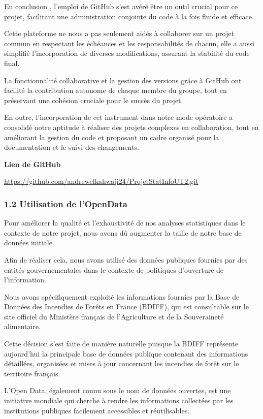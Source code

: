 \documentclass[
]{article}
\begin{document}
En conclusion , l'emploi de GitHub s'est avéré être un outil crucial
pour ce projet, facilitant une administration conjointe du code à la
fois fluide et efficace.

Cette plateforme ne nous a pas seulement aidés à collaborer sur un
projet commun en respectant les échéances et les responsabilités de
chacun, elle a aussi simplifié l'incorporation de diverses
modifications, assurant la stabilité du code final.

La fonctionnalité collaborative et la gestion des versions grâce à
GitHub ont facilité la contribution autonome de chaque membre du groupe,
tout en préservant une cohésion cruciale pour le succès du projet.

En outre, l'incorporation de cet instrument dans notre mode opératoire a
consolidé notre aptitude à réaliser des projets complexes en
collaboration, tout en améliorant la gestion du code et proposant un
cadre organisé pour la documentation et le suivi des changements.

\textbf{Lien de GitHub}

\url{https://github.com/andrewelkahwaji24/ProjetStatInfoUT2.git}

\subsubsection{1.2 Utilisation de
l'OpenData}\label{utilisation-de-lopendata}

Pour améliorer la qualité et l'exhaustivité de nos analyses statistiques
dans le contexte de notre projet, nous avons dû augmenter la taille de
notre base de données initiale.

Afin de réaliser cela, nous avons utilisé des données publiques fournies
par des entités gouvernementales dans le contexte de politiques
d'ouverture de l'information.

Nous avons spécifiquement exploité les informations fournies par la Base
de Données des Incendies de Forêts en France (BDIFF), qui est
consultable sur le site officiel du Ministère français de l'Agriculture
et de la Souveraineté alimentaire.

Cette décision s'est faite de manière naturelle puisque la BDIFF
représente aujourd'hui la principale base de données publique contenant
des informations détaillées, organisées et mises à jour concernant les
incendies de forêt sur le territoire français.

L'Open Data, également connu sous le nom de données ouvertes, est une
initiative mondiale qui cherche à rendre les informations collectées par
les institutions publiques facilement accessibles et réutilisables.
\end{document}
